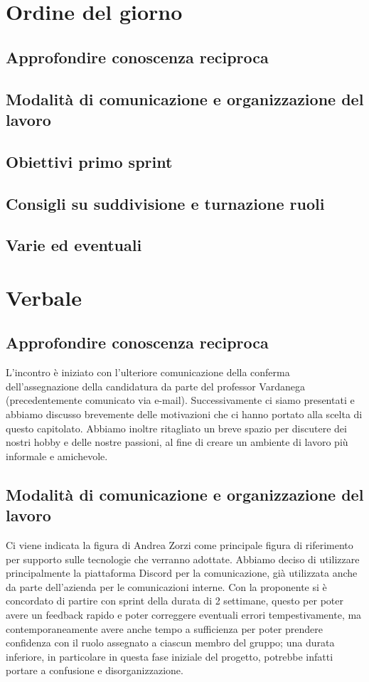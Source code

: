\documentclass[italian,12pt]{article}
\begin{document}
\section{Ordine del giorno}
\subsection{Approfondire conoscenza reciproca}
\subsection{Modalità di comunicazione e organizzazione del lavoro}
\subsection{Obiettivi primo sprint}
\subsection{Consigli su suddivisione e turnazione ruoli}
\subsection{Varie ed eventuali}

\newpage

\section{Verbale}

\subsection{Approfondire conoscenza reciproca}
L'incontro è iniziato con l'ulteriore comunicazione della conferma dell'assegnazione 
della candidatura da parte del professor Vardanega (precedentemente comunicato via e-mail). 
Successivamente ci siamo presentati e abbiamo discusso brevemente delle motivazioni 
che ci hanno portato alla scelta di questo capitolato. Abbiamo inoltre ritagliato un breve spazio 
per discutere dei nostri hobby e delle nostre passioni, al fine di creare un ambiente di lavoro 
più informale e amichevole.

\subsection{Modalità di comunicazione e organizzazione del lavoro}
Ci viene indicata la figura di Andrea Zorzi come principale figura di riferimento per 
supporto sulle tecnologie che verranno adottate. Abbiamo deciso di utilizzare principalmente 
la piattaforma Discord per la comunicazione, già utilizzata anche da parte dell'azienda per 
le comunicazioni interne. Con la proponente si è concordato di partire con sprint della durata 
di 2 settimane, questo per poter avere un feedback rapido e poter correggere eventuali errori 
tempestivamente, ma contemporaneamente avere anche tempo a sufficienza per poter prendere confidenza 
con il ruolo assegnato a ciascun membro del gruppo; una durata inferiore, in particolare 
in questa fase iniziale del progetto, potrebbe infatti portare a confusione e disorganizzazione.
\end{document}
